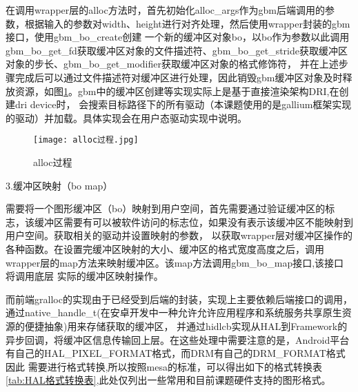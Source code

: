 在调用wrapper层的alloc方法时，首先初始化alloc\_args作为gbm后端调用的参数，根据输入的参数对width、height进行对齐处理，然后使用wrapper封装的gbm接口，使用gbm\_bo\_create创建
一个新的缓冲区对象bo，以bo作为参数以此调用gbm\_bo\_get\_fd获取缓冲区对象的文件描述符、gbm\_bo\_get\_stride获取缓冲区对象的步长、gbm\_bo\_get\_modifier获取缓冲区对象的格式修饰符，
并在上述步骤完成后可以通过文件描述符对缓冲区进行处理，因此销毁gbm缓冲区对象及时释放资源，如图\ref{fig:alloc过程}。gbm中的缓冲区创建等实现实际上是基于直接渲染架构DRI,在创建dri device时，
会搜索目标路径下的所有驱动（本课题使用的是gallium框架实现的驱动）并加载。具体实现会在用户态驱动实现中说明。

\begin{figure}[h]
  \centering
  \texttt{[image: alloc过程.jpg]}
  \caption{alloc过程}
  \label{fig:alloc过程}
\end{figure}


3.缓冲区映射（bo map）

需要将一个图形缓冲区（bo）映射到用户空间，首先需要通过验证缓冲区的标志，该缓冲区需要有可以被软件访问的标志位，如果没有表示该缓冲区不能映射到用户空间。获取相关的驱动并设置映射的参数，
以获取wrapper层对缓冲区操作的各种函数。在设置完缓冲区映射的大小、缓冲区的格式宽度高度之后，调用wrapper层的map方法来映射缓冲区。该map方法调用gbm\_bo\_map接口,该接口将调用底层
实际的缓冲区映射操作。

而前端gralloc的实现由于已经受到后端的封装，实现上主要依赖后端接口的调用，通过native\_handle\_t(在安卓开发中一种允许允许应用程序和系统服务共享原生资源的便捷抽象)用来存储获取的缓冲区，
并通过hidlcb实现从HAL到Framework的异步回调，将缓冲区信息传输回上层。在这些处理中需要注意的是，Android平台有自己的HAL\_PIXEL\_FORMAT格式，而DRM有自己的DRM\_FORMAT格式因此
需要进行格式转换,所以按照mesa的标准，可以得出如下的格式转换表\ref{tab:HAL格式转换表},此处仅列出一些常用和目前课题硬件支持的图形格式。

